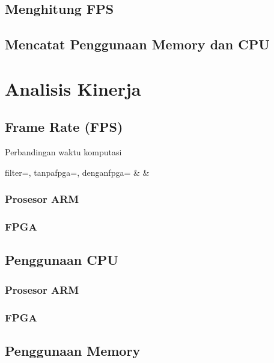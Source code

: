 \subsection{Menghitung FPS}
\subsection{Mencatat Penggunaan Memory dan CPU}


\section{Analisis Kinerja}
\subsection{Frame Rate (FPS)}

\begin{atable}
    \caption{Perbandingan waktu komputasi}
    \label{table:hasil-fps}
        {filter=\filter, tanpafpga=\tanpafpga, denganfpga=\denganfpga}
        {\filter & \tanpafpga & \denganfpga }
\end{atable}

\subsubsection{Prosesor ARM}
\subsubsection{FPGA}

\subsection{Penggunaan CPU}
\blindtext
\subsubsection{Prosesor ARM}
\subsubsection{FPGA}

\subsection{Penggunaan Memory}
\blindtext
